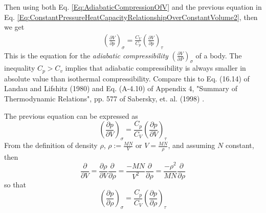 Then using both Eq. \ref{Eq:AdiabaticCompressionOfV} and the previous equation in Eq. \ref{Eq:ConstantPressureHeatCapacityRelationshipOverConstantVolume2}, then we get 
\begin{equation}
\begin{gathered}
\boxed{ \left( \frac{\partial V}{\partial p }\right)_{\sigma} = \frac{C_V}{C_p} \left( \frac{\partial V}{\partial p } \right)_{\tau} }
\end{gathered}
\end{equation}
This is the equation for the \emph{adiabatic compressibility} $\left( \frac{\partial V}{ \partial P} \right)_{\sigma}$ of a body. The inequality $C_p > C_v$ implies that adiabatic compressibility is always smaller in absolute value than isothermal compressibility. Compare this to Eq. (16.14) of Landau and Lifshitz (1980) and Eq. (A-4.10) of Appendix 4, "Summary of Thermodynamic Relations", pp. 577 of Sabersky, et. al. (1998) \cite{SAHG1998}.

The previous equation can be expressed as 
\[
\left(\frac{\partial p}{\partial V }\right)_{\sigma} = \frac{C_p}{C_V} \left( \frac{\partial p}{\partial V } \right)_{\tau} 
\]
From the definition of density $\rho$, $\rho := \frac{MN}{V}$ or $V = \frac{MN}{\rho}$, and assuming $N$ constant, then
\[
\frac{\partial}{\partial V} = \frac{\partial \rho}{\partial V} \frac{\partial }{\partial \rho} = \frac{-MN}{V^2} \frac{\partial}{\partial \rho} = \frac{-\rho^2}{MN} \frac{\partial }{\partial \rho}
\]
so that 
\[
\left(\frac{\partial p}{\partial \rho }\right)_{\sigma} = \frac{C_p}{C_V} \left( \frac{\partial p}{\partial \rho  } \right)_{\tau} 
\]

